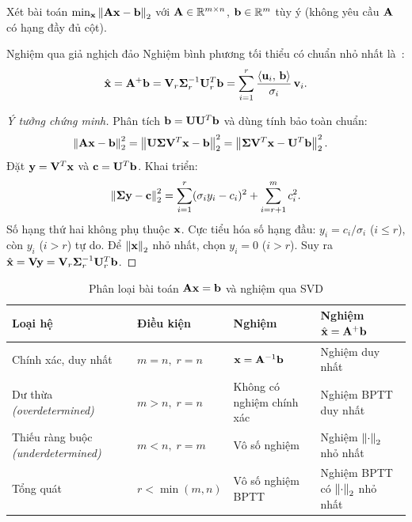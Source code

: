 Xét bài toán $\min_{\mathbf{x}}\left\lVert\mathbf{A}\mathbf{x} - \mathbf{b}\right\rVert_2$ với
$\mathbf{A} \in \mathbb{R}^{m \times n}$, $\mathbf{b} \in \mathbb{R}^m$ tùy ý (không yêu cầu
$\mathbf{A}$ có hạng đầy đủ cột).

\begin{mythm}{Nghiệm qua giả nghịch đảo}{}
Nghiệm bình phương tối thiểu có chuẩn nhỏ nhất là~\cite{strang2023}:
\[
    \hat{\mathbf{x}} = \mathbf{A}^+\mathbf{b}
    = \mathbf{V}_r\boldsymbol{\Sigma}_r^{-1}\mathbf{U}_r^T\mathbf{b}
    = \sum_{i=1}^{r} \frac{\langle \mathbf{u}_i,\, \mathbf{b} \rangle}{\sigma_i}\,\mathbf{v}_i.
\]
\end{mythm}

\begin{proof}[Ý tưởng chứng minh]
Phân tích $\mathbf{b} = \mathbf{U}\mathbf{U}^T\mathbf{b}$ và dùng tính bảo toàn chuẩn:
\begin{align*}
    \left\lVert\mathbf{A}\mathbf{x} - \mathbf{b}\right\rVert_2^2
    &= \left\lVert\mathbf{U}\boldsymbol{\Sigma}\mathbf{V}^T\mathbf{x} - \mathbf{b}\right\rVert_2^2
    = \left\lVert\boldsymbol{\Sigma}\mathbf{V}^T\mathbf{x} - \mathbf{U}^T\mathbf{b}\right\rVert_2^2.
\end{align*}
Đặt $\mathbf{y} = \mathbf{V}^T\mathbf{x}$ và $\mathbf{c} = \mathbf{U}^T\mathbf{b}$. Khai triển:
\[
    \left\lVert\boldsymbol{\Sigma}\mathbf{y} - \mathbf{c}\right\rVert_2^2
    = \sum_{i=1}^r(\sigma_i y_i - c_i)^2 + \sum_{i=r+1}^m c_i^2.
\]
Số hạng thứ hai không phụ thuộc $\mathbf{x}$. Cực tiểu hóa số hạng đầu: $y_i = c_i/\sigma_i$
($i \leq r$), còn $y_i$ ($i > r$) tự do. Để $\left\lVert\mathbf{x}\right\rVert_2$ nhỏ nhất, chọn $y_i = 0$
($i > r$). Suy ra $\hat{\mathbf{x}} = \mathbf{V}\mathbf{y} = \mathbf{V}_r\boldsymbol{\Sigma}_r^{-1}\mathbf{U}_r^T\mathbf{b}$.
\end{proof}

\begin{table}[H]
\centering
\caption{Phân loại bài toán $\mathbf{A}\mathbf{x} = \mathbf{b}$ và nghiệm qua SVD}
\label{tab:svd_cases}
\renewcommand{\arraystretch}{1.7}
\setlength{\tabcolsep}{5pt}
\small
\begin{tabular}{p{3.5cm}p{2.4cm}p{3.5cm}p{4.6cm}}
\toprule
\textbf{Loại hệ} & \textbf{Điều kiện} & \textbf{Nghiệm} &
\textbf{Nghiệm $\hat{\mathbf{x}} = \mathbf{A}^+\mathbf{b}$} \\
\midrule
Chính xác, duy nhất
  & $m = n,\; r = n$
  & $\mathbf{x} = \mathbf{A}^{-1}\mathbf{b}$
  & Nghiệm duy nhất \\[3pt]
Dư thừa \newline\textit{(overdetermined)}
  & $m > n,\; r = n$
  & Không có nghiệm chính xác
  & Nghiệm BPTT duy nhất \\[3pt]
Thiếu ràng buộc \newline\textit{(underdetermined)}
  & $m < n,\; r = m$
  & Vô số nghiệm
  & Nghiệm $\left\lVert\cdot\right\rVert_2$ nhỏ nhất \\[3pt]
Tổng quát
  & $r < \min(m,n)$
  & Vô số nghiệm BPTT
  & Nghiệm BPTT có $\left\lVert\cdot\right\rVert_2$ nhỏ nhất \\
\bottomrule
\end{tabular}
\end{table}

